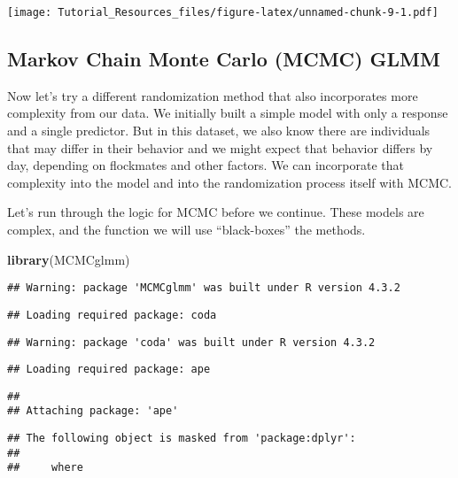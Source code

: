 \documentclass[
]{article}
\newenvironment{Shaded}{\begin{snugshade}}{\end{snugshade}}
\newcommand{\FunctionTok}[1]{\textcolor[rgb]{0.13,0.29,0.53}{\textbf{#1}}}
\newcommand{\NormalTok}[1]{#1}
\begin{document}
\texttt{[image: Tutorial\_Resources\_files/figure-latex/unnamed-chunk-9-1.pdf]}

\hypertarget{markov-chain-monte-carlo-mcmc-glmm}{%
\subsection{Markov Chain Monte Carlo (MCMC)
GLMM}\label{markov-chain-monte-carlo-mcmc-glmm}}

Now let's try a different randomization method that also incorporates
more complexity from our data. We initially built a simple model with
only a response and a single predictor. But in this dataset, we also
know there are individuals that may differ in their behavior and we
might expect that behavior differs by day, depending on flockmates and
other factors. We can incorporate that complexity into the model and
into the randomization process itself with MCMC.

Let's run through the logic for MCMC before we continue. These models
are complex, and the function we will use ``black-boxes'' the methods.

\begin{Shaded}
\begin{Highlighting}[]
\FunctionTok{library}\NormalTok{(MCMCglmm)}
\end{Highlighting}
\end{Shaded}

\begin{verbatim}
## Warning: package 'MCMCglmm' was built under R version 4.3.2
\end{verbatim}

\begin{verbatim}
## Loading required package: coda
\end{verbatim}

\begin{verbatim}
## Warning: package 'coda' was built under R version 4.3.2
\end{verbatim}

\begin{verbatim}
## Loading required package: ape
\end{verbatim}

\begin{verbatim}
## 
## Attaching package: 'ape'
\end{verbatim}

\begin{verbatim}
## The following object is masked from 'package:dplyr':
## 
##     where
\end{verbatim}
\end{document}
